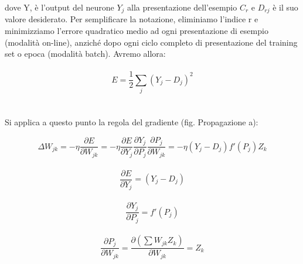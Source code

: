 \documentclass[10pt,a4paper]{article}
\begin{document}
dove Y, è l'output del neurone $Y_j$ alla presentazione dell'esempio $C_r$ e $D_{rj}$ è il
suo valore desiderato. Per semplificare la notazione, eliminiamo l'indice r e minimizziamo l'errore quadratico medio ad ogni presentazione di esempio (modalità on-line), anziché dopo ogni ciclo completo di presentazione del training set
o epoca (modalità batch). Avremo allora:
\\ \\
\begin{equation} \label{eq:eq}
E = \frac{1}{2} \sum_j{(Y_{j} - D_{j})^2}
\end{equation}
\\ \\
Si applica a questo punto la regola del gradiente (fig. Propagazione a):

\begin{equation} 
\label{eq:grad}
\Delta W_{jk} = - \eta \frac{\partial E}{\partial W_{jk}} = - \eta \frac{\partial E}{\partial Y_j} \frac{\partial Y_j}{\partial P_j} \frac{\partial P_j}{\partial W_{jk}} = 
-\eta(Y_j - D_j)f'(P_j)Z_k
\end{equation} \\
\begin{equation} \label{eq:dey}
\frac{\partial E}{\partial Y_j} = (Y_j - D_j)
\end{equation} \\
\begin{equation} \label{eq:dyp}
\frac{\partial Y_j}{\partial P_j} = f'(P_j) 
\end{equation} \\
\begin{equation} \label{eq:dpw}
\frac{\partial P_j}{\partial W_{jk}} = \frac{\partial(\sum W_{jk} Z_k)}{\partial W_{jk}} = Z_k
\end{equation}
\end{document}
